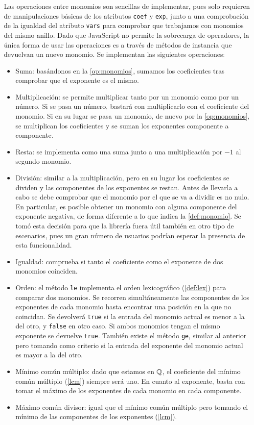 Las operaciones entre monomios son sencillas de implementar, pues solo requieren de manipulaciones básicas de los atributos \texttt{coef} y \texttt{exp}, junto a una comprobación de la igualdad del atributo \texttt{vars} para comprobar que trabajamos con monomios del mismo anillo. Dado que JavaScript no permite la sobrecarga de operadores, la única forma de usar las operaciones es a través de métodos de instancia que devuelvan un nuevo monomio. Se implementan las siguientes operaciones:
\begin{itemize}
    \item Suma: basándonos en la \autoref{op:monomios}, sumamos los coeficientes tras comprobar que el exponente es el mismo.
    \item Multiplicación: se permite multiplicar tanto por un monomio como por un número. Si se pasa un número, bastará con multiplicarlo con el coeficiente del monomio. Si en su lugar se pasa un monomio, de nuevo por la \autoref{op:monomios}, se multiplican los coeficientes y se suman los exponentes componente a componente.
    \item Resta: se implementa como una suma junto a una multiplicación por $-1$ al segundo monomio.
    \item División: similar a la multiplicación, pero en su lugar los coeficientes se dividen y las componentes de los exponentes se restan. Antes de llevarla a cabo se debe comprobar que el monomio por el que se va a dividir es no nulo. En particular, es posible obtener un monomio con alguna componente del exponente negativa, de forma diferente a lo que indica la \autoref{def:monomio}. Se tomó esta decisión para que la librería fuera útil también en otro tipo de escenarios, pues un gran número de usuarios podrían esperar la presencia de esta funcionalidad.
    \item Igualdad: comprueba si tanto el coeficiente como el exponente de dos monomios coinciden.
    \item Orden: el método \texttt{le} implementa el orden lexicográfico (\autoref{def:lex}) para comparar dos monomios. Se recorren simultáneamente las componentes de los exponentes de cada monomio hasta encontrar una posición en la que no coincidan. Se devolverá \texttt{true} si la entrada del monomio actual es menor a la del otro, y \texttt{false} en otro caso. Si ambos monomios tengan el mismo exponente se devuelve \texttt{true}. También existe el método \texttt{ge}, similar al anterior pero tomando como criterio si la entrada del exponente del monomio actual es mayor a la del otro.
    \item Mínimo común múltiplo: dado que estamos en $\mathbb{Q}$, el coeficiente del mínimo común múltiplo (\autoref{lcm}) siempre será uno. En cuanto al exponente, basta con tomar el máximo de los exponentes de cada monomio en cada componente.
    \item Máximo común divisor: igual que el mínimo común múltiplo pero tomando el mínimo de las componentes de los exponentes (\autoref{lcm}).
\end{itemize}
